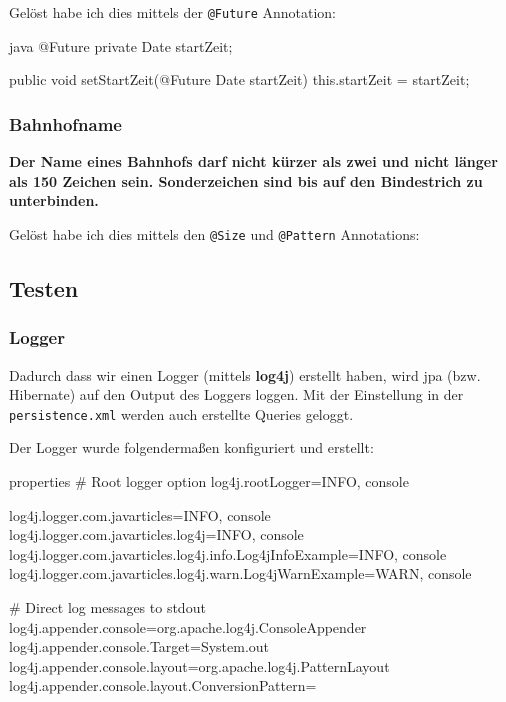 Gelöst habe ich dies mittels der \texttt{@Future} Annotation:

\begin{code}{java}
@Future
private Date startZeit;

public void setStartZeit(@Future Date startZeit) {
    this.startZeit = startZeit;
}
\end{code}

\subsubsection{Bahnhofname}
\textbf{Der Name eines Bahnhofs darf nicht kürzer als zwei und nicht länger als 150 Zeichen sein. Sonderzeichen sind bis auf den Bindestrich zu unterbinden.}

Gelöst habe ich dies mittels den \texttt{@Size} und \texttt{@Pattern} Annotations:

\clearpage
\subsection{Testen}

\subsubsection{Logger}

Dadurch dass wir einen Logger (mittels \textbf{log4j}) erstellt haben, wird \gls{jpa} (bzw. Hibernate) auf den Output des Loggers loggen. Mit der Einstellung in der \texttt{persistence.xml} werden auch erstellte Queries geloggt.

Der Logger wurde folgendermaßen konfiguriert und erstellt:

\begin{code}{properties}
# Root logger option
log4j.rootLogger=INFO, console

log4j.logger.com.javarticles=INFO, console
log4j.logger.com.javarticles.log4j=INFO, console
log4j.logger.com.javarticles.log4j.info.Log4jInfoExample=INFO, console
log4j.logger.com.javarticles.log4j.warn.Log4jWarnExample=WARN, console

# Direct log messages to stdout
log4j.appender.console=org.apache.log4j.ConsoleAppender
log4j.appender.console.Target=System.out
log4j.appender.console.layout=org.apache.log4j.PatternLayout
log4j.appender.console.layout.ConversionPattern=%
\end{code}

